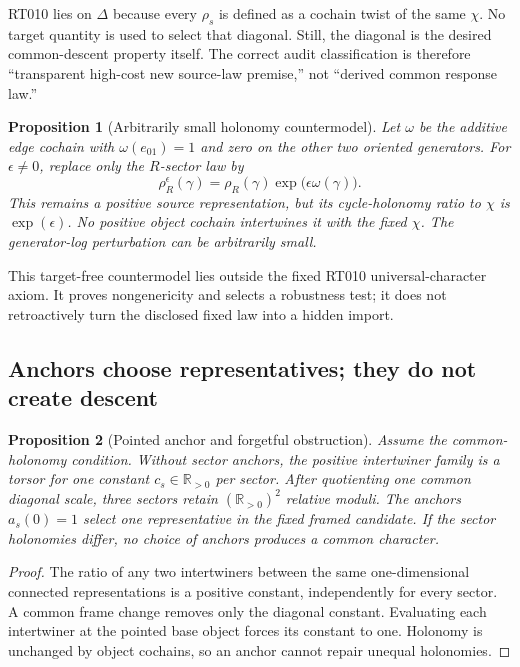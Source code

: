\documentclass[11pt]{article}
\newtheorem{proposition}{Proposition}
\newcommand{\Rp}{\mathbb{R}_{>0}}
\begin{document}
RT010 lies on $\Delta$ because every $\rho_s$ is defined as a cochain twist of
the same $\chi$.  No target quantity is used to select that diagonal.  Still,
the diagonal is the desired common-descent property itself.  The correct audit
classification is therefore ``transparent high-cost new source-law premise,''
not ``derived common response law.''

\begin{proposition}[Arbitrarily small holonomy countermodel]
Let $\omega$ be the additive edge cochain with $\omega(e_{01})=1$ and zero on
the other two oriented generators.  For $\epsilon\ne0$, replace only the
$R$-sector law by
\[
 \rho_R^{\epsilon}(\gamma)=\rho_R(\gamma)
 \exp\!\bigl(\epsilon\omega(\gamma)\bigr).
\]
This remains a positive source representation, but its cycle-holonomy ratio to
$\chi$ is $\exp(\epsilon)$.  No positive object cochain intertwines it with the
fixed $\chi$.  The generator-log perturbation can be arbitrarily small.
\end{proposition}

This target-free countermodel lies outside the fixed RT010 universal-character
axiom.  It proves nongenericity and selects a robustness test; it does not
retroactively turn the disclosed fixed law into a hidden import.

\subsection{Anchors choose representatives; they do not create descent}

\begin{proposition}[Pointed anchor and forgetful obstruction]
Assume the common-holonomy condition.  Without sector anchors, the positive
intertwiner family is a torsor for one constant $c_s\in\Rp$ per sector.  After
quotienting one common diagonal scale, three sectors retain $(\Rp)^2$ relative
moduli.  The anchors $a_s(0)=1$ select one representative in the fixed framed
candidate.  If the sector holonomies differ, no choice of anchors produces a
common character.
\end{proposition}

\begin{proof}
The ratio of any two intertwiners between the same one-dimensional connected
representations is a positive constant, independently for every sector.  A
common frame change removes only the diagonal constant.  Evaluating each
intertwiner at the pointed base object forces its constant to one.  Holonomy is
unchanged by object cochains, so an anchor cannot repair unequal holonomies.
\end{proof}
\end{document}
